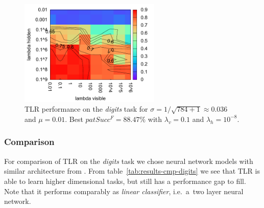 
\begin{figure}[H]
  \centering
  \includegraphics[width=0.60\textwidth]{img/tlr-digits-psf.pdf} 
  \caption{TLR performance on the \emph{digits} task for $\sigma = 1/\sqrt{784+1} \approx 0.036$ and $\mu = 0.01$. Best $patSucc^F = 88.47\%$ with $\lambda_v=0.1$ and $\lambda_h=10^{-8}$.}
  \label{fig:results-tlr-digits-success}
\end{figure}



\subsubsection{Comparison} 
\label{sec:results-cmp-digits} 

For comparison of TLR on the \emph{digits} task we chose neural network models with similar architecture from \citet{digits2014mnist}. From table~\ref{tab:results-cmp-digits} we see that TLR is able to learn higher dimensional tasks, but still has a performance gap to fill. Note that it performs comparably as \emph{linear classifier}, i.e.~a~two layer neural network. 

